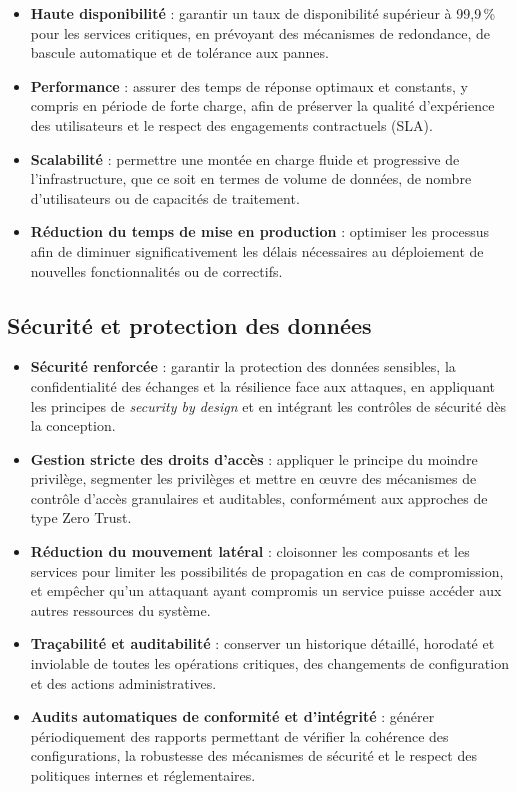 \begin{itemize}
	\item \textbf{Haute disponibilité} : garantir un taux de disponibilité supérieur à 99,9\,\% pour les services critiques, en prévoyant des mécanismes de redondance, de bascule automatique et de tolérance aux pannes.

	\item \textbf{Performance} : assurer des temps de réponse optimaux et constants, y compris en période de forte charge, afin de préserver la qualité d'expérience des utilisateurs et le respect des engagements contractuels (SLA).

	\item \textbf{Scalabilité} : permettre une montée en charge fluide et progressive de l'infrastructure, que ce soit en termes de volume de données, de nombre d'utilisateurs ou de capacités de traitement.

	\item \textbf{Réduction du temps de mise en production} : optimiser les processus afin de diminuer significativement les délais nécessaires au déploiement de nouvelles fonctionnalités ou de correctifs.
\end{itemize}

\subsection{Sécurité et protection des données}

\begin{itemize}
	\item \textbf{Sécurité renforcée} : garantir la protection des données sensibles, la confidentialité des échanges et la résilience face aux attaques, en appliquant les principes de \emph{security by design} et en intégrant les contrôles de sécurité dès la conception.

	\item \textbf{Gestion stricte des droits d'accès} : appliquer le principe du moindre privilège, segmenter les privilèges et mettre en œuvre des mécanismes de contrôle d'accès granulaires et auditables, conformément aux approches de type Zero Trust.

	\item \textbf{Réduction du mouvement latéral} : cloisonner les composants et les services pour limiter les possibilités de propagation en cas de compromission, et empêcher qu’un attaquant ayant compromis un service puisse accéder aux autres ressources du système.

	\item \textbf{Traçabilité et auditabilité} : conserver un historique détaillé, horodaté et inviolable de toutes les opérations critiques, des changements de configuration et des actions administratives.

	\item \textbf{Audits automatiques de conformité et d'intégrité} : générer périodiquement des rapports permettant de vérifier la cohérence des configurations, la robustesse des mécanismes de sécurité et le respect des politiques internes et réglementaires.
\end{itemize}

